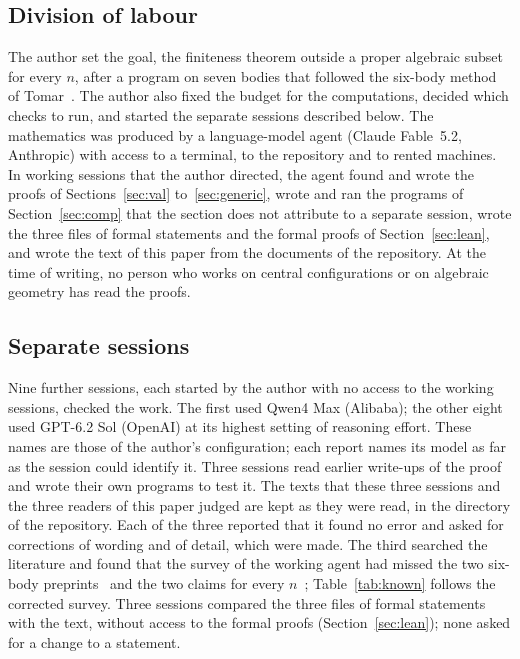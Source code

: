 \documentclass[11pt]{amsart}
\theoremstyle{definition}
\theoremstyle{remark}
\numberwithin{equation}{section}
\newcommand{\repo}[1]{\texttt{\detokenize{#1}}}
\begin{document}
\subsection*{Division of labour} The author set the goal, the finiteness theorem outside a proper
algebraic subset for every $n$, after a program on seven bodies that followed the six-body method of
Tomar~\cite{tomar6}. The author also fixed the budget for the computations, decided which checks to
run, and started the separate sessions described below. The mathematics was produced by a
language-model agent (Claude Fable~5.2, Anthropic) with access to a terminal, to the repository and to
rented machines. In working sessions that the author directed, the agent found and wrote the proofs of
Sections~\ref{sec:val} to~\ref{sec:generic}, wrote and ran the programs of Section~\ref{sec:comp} that the section does not attribute to a
separate session, wrote the three files of formal statements and the formal proofs of
Section~\ref{sec:lean}, and wrote the text of this paper from the documents of the repository. At the time of writing, no person who works
on central configurations or on algebraic geometry has read the proofs.

\subsection*{Separate sessions} Nine further sessions, each started by the author with no access to
the working sessions, checked the work. The first used Qwen4 Max (Alibaba); the other eight used
GPT-6.2 Sol (OpenAI) at its highest setting of reasoning effort. These names are those of the author's
configuration; each report names its model as far as the session could identify it. Three sessions read earlier write-ups
of the proof and wrote their own programs to test it. The texts that these three sessions and the
three readers of this paper judged are kept as they were read, in the directory \repo{docs/as-read} of
the repository.
Each of the three reported that it found no error and asked for corrections of wording and of detail,
which were made. The third searched the literature and found that the survey of the working agent had
missed the two six-body preprints~\cite{tomar6,chentong6} and the two claims for every
$n$~\cite{tibboel2013,okolo2026}; Table~\ref{tab:known} follows the corrected survey. Three sessions
compared the three files of formal statements with the text, without access to the formal proofs
(Section~\ref{sec:lean}); none asked for a change to a statement.
\end{document}
